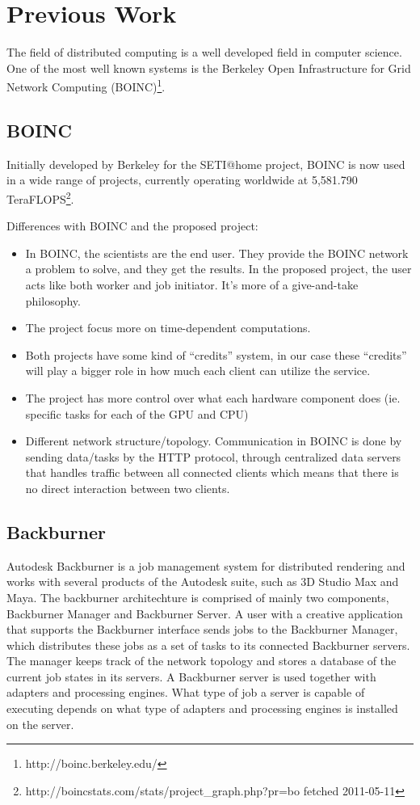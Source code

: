 \chapter{Previous Work}
The field of distributed computing is a well developed field in computer
science. One of the most well known systems is the Berkeley Open Infrastructure
for Grid Network Computing (BOINC)\footnote{http://boinc.berkeley.edu/}.
	



\section{BOINC}
Initially developed by Berkeley for the SETI@home project, BOINC is now used in
a wide range of projects, currently operating worldwide at 5,581.790 
TeraFLOPS\footnote{http://boincstats.com/stats/project\_graph.php?pr=bo 
fetched 2011-05-11}.

Differences with BOINC and the proposed project:
\begin{itemize}
	\item In BOINC, the scientists are the end user. They provide the BOINC network
		a problem to solve, and they get the results. In the proposed project, 
		the user acts like both worker and job initiator. It’s more of a 
		give-and-take philosophy.
	\item The project focus more on time-dependent computations.
	\item Both projects have some kind of “credits” system, in our case these
		“credits” will play a bigger role in how much each client can utilize
		the service.
	\item The project has more control over what each hardware component does
		(ie. specific tasks for each of the GPU and CPU)
	\item Different network structure/topology. Communication in BOINC is done
		by sending data/tasks by the HTTP protocol, through centralized data
		servers that handles traffic between all connected clients which means 
		that there is no direct interaction between two clients. 
\end{itemize}

\section{Backburner}

Autodesk Backburner is a job management system for distributed rendering and works with several products of the Autodesk suite, such as 3D Studio Max and Maya. The backburner architechture is comprised of mainly two components, Backburner Manager and Backburner Server. A user with a creative application that supports the Backburner interface sends jobs to the Backburner Manager, which distributes these jobs as a set of tasks to its connected Backburner servers. The manager keeps track of the network topology and stores a database of the current job states in its servers. A Backburner server is used together with adapters and processing engines. What type of job a server is capable of executing depends on what type of adapters and processing engines is installed on the server. 

